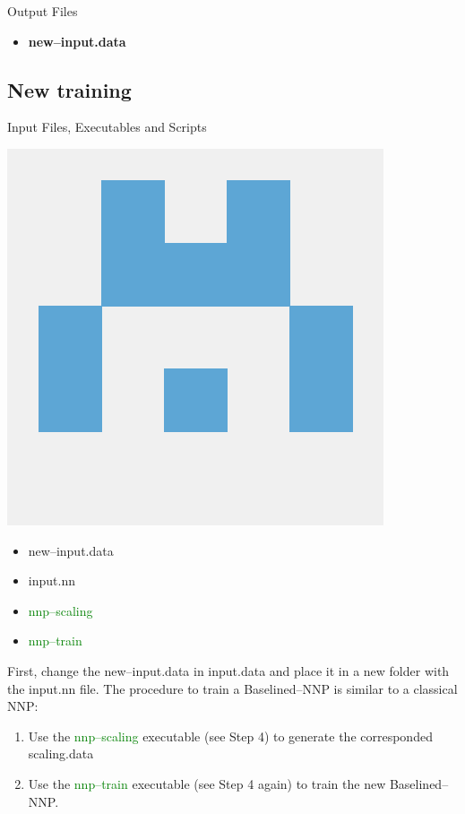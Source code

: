 \documentclass[12pt]{article}
\begin{document}
\begin{mybox3}{Output Files}
\begin{itemize}
    \item \textbf{new--input.data}
\end{itemize}
\end{mybox3}
%
\subsection{New training}
\begin{mybox2}{{Input Files, Executables and Scripts}}
\begin{minipage}[c]{0.5\linewidth}
\includegraphics[scale=0.1]{n2p2.png}
\end{minipage}
\begin{minipage}[c]{0.5\linewidth}
\begin{itemize}
    \item new--input.data
    \item input.nn
    \item \textcolor{green}{nnp--scaling}
    \item \textcolor{green}{nnp--train}
\end{itemize}
\end{minipage}
\end{mybox2}
First, change the new--input.data in input.data and place it in a new folder with the input.nn file. The procedure to train a Baselined--NNP is similar to a classical NNP:
\begin{enumerate}
    \item Use the \textcolor{green}{nnp--scaling} executable (see Step 4) to generate the corresponded scaling.data
    \item Use the \textcolor{green}{nnp--train} executable (see Step 4 again) to train the new Baselined--NNP. 
\end{enumerate}
\end{document}
